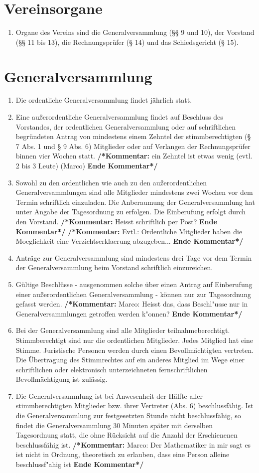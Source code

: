 \documentclass[a4paper,12pt]{article}
\newcommand{\comment}[1]{{\bf /*Kommentar:} #1 {\bf Ende Kommentar*/}}
\begin{document}
\section{Vereinsorgane} %
\begin{enumerate}
\item Organe des Vereins sind die Generalversammlung (§§ 9 und 10), der Vorstand (§§ 11 bis 13), die Rechnungsprüfer (§ 14) und das Schiedsgericht (§ 15).
\end{enumerate}

\section{Generalversammlung} %
\begin{enumerate}
\item Die ordentliche Generalversammlung findet jährlich statt.
\item Eine außerordentliche Generalversammlung findet auf Beschluss des Vorstandes, der ordentlichen Generalversammlung oder auf schriftlichen begründeten Antrag von mindestens einem Zehntel der stimmberechtigten (§ 7 Abs. 1 und § 9 Abs. 6) Mitglieder oder auf Verlangen der Rechnungsprüfer binnen vier Wochen statt.
\comment{ein Zehntel ist etwas wenig (evtl. 2 bis 3 Leute) (Marco)}
\item Sowohl zu den ordentlichen wie auch zu den außerordentlichen Generalversammlungen sind alle Mitglieder mindestens zwei Wochen vor dem Termin schriftlich einzuladen. Die Anberaumung der Generalversammlung hat unter Angabe der Tagesordnung zu erfolgen. Die Einberufung erfolgt durch den Vorstand.
\comment{Heisst schriftlich per Post?}
\comment{Evtl.: Ordentliche Mitglieder haben die Moeglichkeit eine Verzichtserklaerung abzugeben...}
\item Anträge zur Generalversammlung sind mindestens drei Tage vor dem Termin der Generalversammlung beim Vorstand schriftlich einzureichen.
\item Gültige Beschlüsse - ausgenommen solche über einen Antrag auf Einberufung einer außerordentlichen Generalversammlung - können nur zur Tagesordnung gefasst werden.
\comment{Marco: Heisst das, dass Beschl"usse nur in Generalversammlungen getroffen werden k"onnen?}
\item Bei der Generalversammlung sind alle Mitglieder teilnahmeberechtigt. Stimmberechtigt sind nur die ordentlichen Mitglieder. Jedes Mitglied hat eine Stimme. Juristische Personen werden durch einen Bevollmächtigten vertreten. Die Übertragung des Stimmrechtes auf ein anderes Mitglied im Wege einer schriftlichen oder elektronisch unterzeichneten fernschriftlichen Bevollmächtigung ist zulässig.
\item Die Generalversammlung ist bei Anwesenheit der Hälfte aller stimmberechtigten Mitglieder bzw. ihrer Vertreter (Abs. 6) beschlussfähig. Ist die Generalversammlung zur festgesetzten Stunde nicht beschlussfähig, so findet die Generalversammlung 30 Minuten später mit derselben Tagesordnung statt, die ohne Rücksicht auf die Anzahl der Erschienenen beschlussfähig ist.
\comment{Marco: Der Mathematiker in mir sagt es ist nicht in Ordnung, theoretisch zu erlauben, dass eine Person alleine beschlussf"ahig ist}


\end{enumerate}
\end{document}
